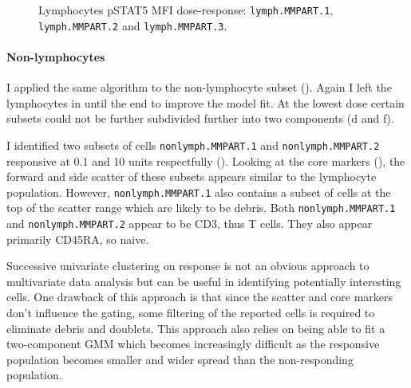 \begin{figure}
\begin{minipage}{.5\textwidth}
\end{minipage}
\begin{minipage}{.3\textwidth}
{ Lymphocytes pSTAT5 MFI dose-response: \texttt{lymph.MMPART.1}, \texttt{lymph.MMPART.2} and \texttt{lymph.MMPART.3}. }
{ }
\end{minipage}
\end{figure}

\clearpage


\paragraph{Non-lymphocytes}

I applied the same algorithm to the non-lymphocyte subset ().
Again I left the lymphocytes in until the end to improve the model fit.
At the lowest dose certain subsets could not be further subdivided further into two components (d and f).

I identified two subsets of cells \texttt{nonlymph.MMPART.1} and \texttt{nonlymph.MMPART.2} responsive at 0.1 and 10 units respectfully ().
Looking at the core markers (), the forward and side scatter of these subsets appears similar to the lymphocyte population.
However, \texttt{nonlymph.MMPART.1} also contains a subset of cells at the top of the scatter range which are likely to be debris.
Both \texttt{nonlymph.MMPART.1} and \texttt{nonlymph.MMPART.2} appear to be CD3\positive, thus T cells.
They also appear primarily CD45RA\negative, so naive.

Successive univariate clustering on response is not an obvious approach to multivariate data analysis but can be useful in identifying potentially interesting cells.
One drawback of this approach is that since the scatter and core markers don't influence the gating, some filtering of the reported cells is required to eliminate
debris and doublets.
This approach also relies on being able to fit a two-component \gls{GMM} which becomes increasingly difficult as the responsive population becomes smaller and wider
spread than the non-responding population.

